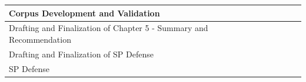 \begin{table}[ht]
{{\begin{tabular}{|p{2in}|c|c|c|c|c|c|c|c|c|}
Corpus Development and Validation															&   &  &  &  &  &  & \weekthree & \weekthree &  \\ \hline
Drafting and Finalization of Chapter 5 - Summary and Recommendation							&   &  &  &  &  &  &  & \weektwo & \weektwo \\ \hline
Drafting and Finalization of SP Defense														&   &  &  &  &  &  &  &  & \weekone \\ \hline
SP Defense																					&   &  &  &  &  &  &  &  & \weekone \\ \hline
\end{tabular}
}}
\label{tab:timetableactivities}
\end{table}

